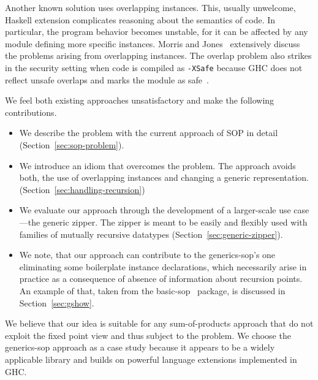 \documentclass[runningheads]{llncs}
\begin{document}
Another known solution uses overlapping instances. This, usually unwelcome, Haskell extension complicates reasoning about the semantics of code. In particular, the program behavior becomes unstable, for it can be affected by any module defining more specific instances. Morris and Jones~\cite{Morris2010} extensively discuss the problems arising from overlapping instances.
The overlap problem also strikes in the security setting when code is compiled as \texttt{-XSafe} because GHC does not reflect unsafe overlaps and marks the module as safe~\cite{sh-overlapping}.

We feel both existing approaches unsatisfactory and make the following contributions.
\begin{itemize}
\item We describe the problem with the current approach of SOP in detail (Section~\ref{sec:sop-problem}).
\item We introduce an idiom that overcomes the problem. The approach avoids both, the use of overlapping instances and changing a generic representation. (Section~\ref{sec:handling-recursion})
\item We evaluate our approach through the development of a larger-scale use case---the generic zipper. The zipper is meant to be easily and flexibly used with families of mutually recursive datatypes (Section~\ref{sec:generic-zipper}).
\item We note, that our approach can contribute to the \textsf{generics-sop}'s one eliminating some boilerplate instance declarations, which necessarily  arise in practice as a consequence of absence of information about recursion points. An example of that, taken from the \textsf{basic-sop}~\cite{basic-sop} package, is discussed in Section~\ref{sec:gshow}.
\end{itemize}

We believe that our idea is suitable for any sum-of-products approach that do not exploit the fixed point view and thus subject to the problem. We choose the \textsf{generics-sop} approach as a case study because it appears to be a widely applicable library and builds on powerful language extensions implemented in GHC.
\end{document}
